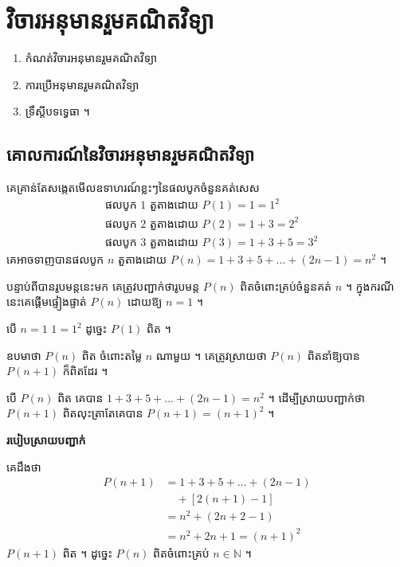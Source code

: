 \chapter{វិចារអនុមានរួមគណិតវិទ្យា}

\begin{objBox}[វត្ថុបំណង]
\begin{enumerate}[1]
  \item កំណត់វិចារអនុមានរួមគណិតវិទ្យា
  \item ការប្រើអនុមានរួមគណិតវិទ្យា
  \item ទ្រឹស្តីបទទ្វេធា ។
\end{enumerate}
\end{objBox}

\section{គោលការណ៍នៃវិចារអនុមានរួមគណិតវិទ្យា}

គេគ្រាន់តែសង្កេតមើលឧទាហរណ៍ខ្លះៗនៃផលបូកចំនួនគត់សេស
\[
\begin{aligned}
&\text{ផលបូក } 1 \text{ តួតាងដោយ } P(1) = 1 = 1^2\\
&\text{ផលបូក } 2 \text{ តួតាងដោយ } P(2) = 1 + 3 = 2^2\\
&\text{ផលបូក } 3 \text{ តួតាងដោយ } P(3) = 1 + 3 + 5 = 3^2
\end{aligned}
\]
គេអាចទាញបានផលបូក $n$ តួតាងដោយ $P(n) = 1 + 3 + 5 + \ldots + (2n - 1) = n^2$ ។

បន្ទាប់ពីបានរូបមន្តនេះមក គេត្រូវបញ្ជាក់ថារូបមន្ត $P(n)$ ពិតចំពោះគ្រប់ចំនួនគត់ $n$ ។ ក្នុងករណីនេះគេផ្តើមផ្ទៀងផ្ទាត់ $P(n)$ ដោយឱ្យ $n = 1$ ។

បើ $n = 1$ \quad $1 = 1^2$ ដូច្នេះ $P(1)$ ពិត ។

ឧបមាថា $P(n)$ ពិត ចំពោះតម្លៃ $n$ ណាមួយ ។ គេត្រូវស្រាយថា $P(n)$ ពិតនាំឱ្យបាន $P(n+1)$ ក៏ពិតដែរ ។

បើ $P(n)$ ពិត គេបាន $1 + 3 + 5 + \ldots + (2n - 1) = n^2$ ។ ដើម្បីស្រាយបញ្ជាក់ថា $P(n+1)$ ពិតលុះត្រាតែគេបាន $P(n+1) = (n+1)^2$ ។

\textbf{របៀបស្រាយបញ្ជាក់}

គេដឹងថា
\[
\begin{aligned}
P(n+1) &= 1 + 3 + 5 + \ldots + (2n - 1)\\
&\quad + [2(n + 1) - 1]\\
&= n^2 + (2n + 2 - 1)\\
&= n^2 + 2n + 1 = (n + 1)^2
\end{aligned}
\]
$P(n+1)$ ពិត ។ ដូច្នេះ $P(n)$ ពិតចំពោះគ្រប់ $n \in \mathbb{N}$ ។

